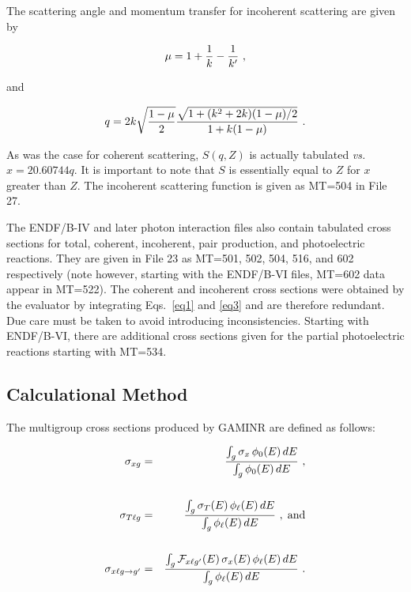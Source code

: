 \noindent
The scattering angle and momentum transfer for incoherent scattering
are given by

  \begin{equation}
    \mu=1+{1\over k}-{1 \over k'}  \,\,,
  \label{eq5}
  \end{equation}

\noindent
and

  \begin{equation}
    q=2k\sqrt{{1-\mu}\over 2} {{\sqrt{1+(k^2 +2k)(1-\mu)/2}}
    \over {1+k(1-\mu)}} \,\,.
  \label{eq6}
  \end{equation}
\vspace{0.5 pt}

\noindent
As was the case for coherent scattering, $S(q,Z)$ is actually tabulated
{\it vs.} $x=20.60744q$.  It is important to note that $S$ is essentially
equal to $Z$ for $x$ greater than $Z$.  The incoherent scattering function
is given as MT=504 in File 27.

The ENDF/B-IV and later photon interaction files also contain
tabulated cross sections for total, coherent, incoherent, pair
production, and photoelectric reactions.
They are given in File 23 as MT=501, 502, 504, 516, and 602
respectively (note however, starting with the ENDF/B-VI files, MT=602 data
appear in MT=522).  The coherent and incoherent cross sections were
obtained by the evaluator by integrating Eqs.~\ref{eq1} and
\ref{eq3} and are therefore redundant.  Due care must be taken
to avoid introducing inconsistencies.  Starting with ENDF/B-VI,
there are additional cross sections given for the partial
photoelectric reactions starting with MT=534.


\subsection{Calculational Method}
\label{ssGAMINR_CalcMethod}

The multigroup cross sections produced by GAMINR are defined as
follows:

  \begin{eqnarray}
    \sigma_{xg}&=&{{\int_g\sigma_x\,\phi_0(E)\,dE}
    \over {\int_g\phi_0(E)\,dE}} \,\,,\\
    \mbox{}\nonumber\\
    \sigma_{T\ell g}&=&{{\int_g\sigma_T(E)\,\phi_\ell(E)\,dE}
    \over {\int_g\phi_\ell(E)\,dE}} \,\,,\;\hbox{and}\\
    \mbox{}\nonumber\\
    \sigma_{x\ell g\rightarrow g'}&=&
    {{\int_g{\cal F}_{x\ell g'}(E)\,\sigma_x(E)\,\phi_\ell(E)\,dE}
    \over {\int_g\phi_\ell(E)\,dE}} \,\,.
  \end{eqnarray}


